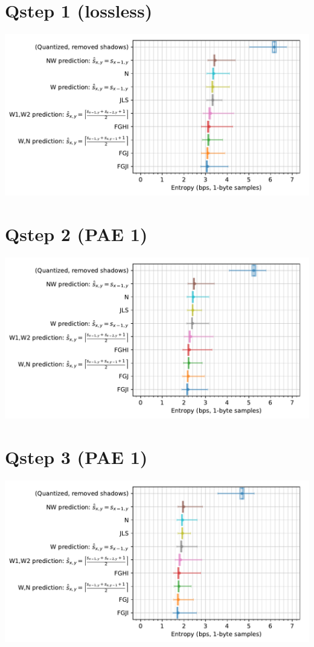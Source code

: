 \documentclass{class/technicalReportUAB}
\begin{document}
\coverpage

\section{Qstep 1 (lossless)}
\includegraphics[width=\linewidth]{./plots_q1/ScalarNumericAnalyzer-entropy_1B_bps-boxplot-groupby__version_name.pdf}

\section{Qstep 2 (PAE 1)}
\includegraphics[width=\linewidth]{./plots_q2/ScalarNumericAnalyzer-entropy_1B_bps-boxplot-groupby__version_name.pdf}

\section{Qstep 3 (PAE 1)}
\includegraphics[width=\linewidth]{./plots_q3/ScalarNumericAnalyzer-entropy_1B_bps-boxplot-groupby__version_name.pdf}
\end{document}
